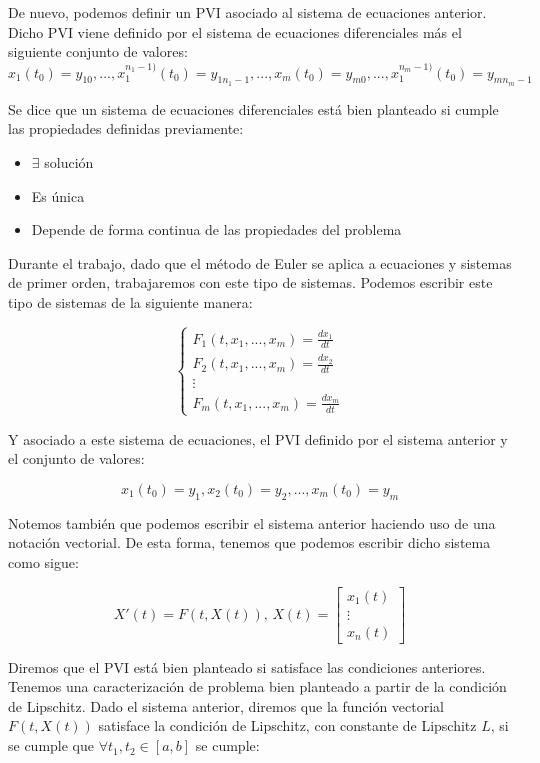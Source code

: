 \documentclass[12pt]{article}       %
\begin{document}
De nuevo, podemos definir un PVI asociado al sistema de ecuaciones anterior. Dicho PVI viene definido por el sistema de ecuaciones diferenciales más el siguiente conjunto de valores:
$$ x_1(t_0) = y_{10}, ..., x_1^{n_1-1)}(t_0) = y_{1n_1-1}, ..., x_m(t_0) = y_{m0}, ..., x_1^{n_m-1)}(t_0) = y_{mn_m-1} $$

Se dice que un sistema de ecuaciones diferenciales está bien planteado si cumple las propiedades definidas previamente:

\begin{itemize}
\item $\exists$ solución
\item Es única
\item Depende de forma continua de las propiedades del problema
\end{itemize}

Durante el trabajo, dado que el método de Euler se aplica a ecuaciones y sistemas de primer orden, trabajaremos con este tipo de sistemas. Podemos escribir este tipo de sistemas de la siguiente manera:

$$
\begin{cases}
F_1(t, x_1, ..., x_m) = \frac{d x_1}{d t} \\
F_2(t, x_1, ..., x_m) = \frac{d x_2}{d t} \\
\vdots \\
F_m(t, x_1, ..., x_m) = \frac{d x_m}{d t}
\end{cases}
$$

Y asociado a este sistema de ecuaciones, el PVI definido por el sistema anterior y el conjunto de valores:

$$ x_1(t_0) = y_1, x_2(t_0) = y_2, ..., x_m(t_0) = y_m $$

Notemos también que podemos escribir el sistema anterior haciendo uso de una notación vectorial. De esta forma, tenemos que podemos escribir dicho sistema como sigue:

$$
X'(t)=F(t,X(t)), \, 
X(t)=\begin{bmatrix}
    x_1(t) \\
    \vdots \\
    x_n(t)
    \end{bmatrix}
$$

Diremos que el PVI está bien planteado si satisface las condiciones anteriores. Tenemos una caracterización de problema bien planteado a partir de la condición de Lipschitz. Dado el sistema anterior, diremos que la función vectorial $F(t, X(t))$ satisface la condición de Lipschitz, con constante de Lipschitz $L$, si se cumple que $\forall t_1, t_2 \in [a,b]$ se cumple:
\end{document}

